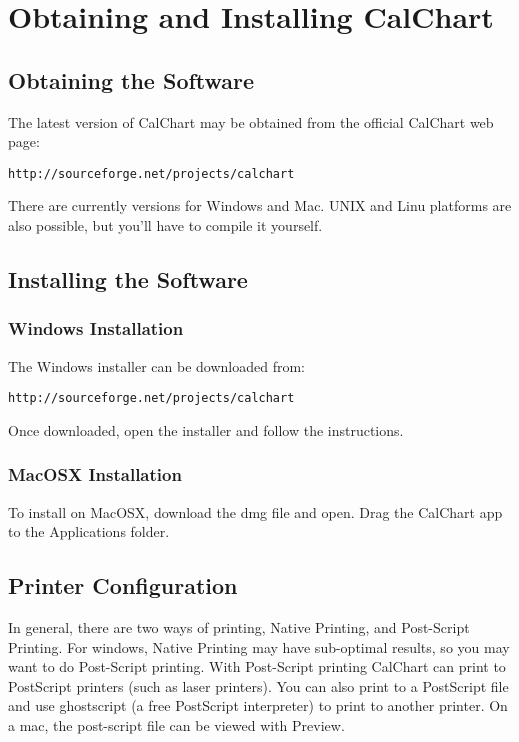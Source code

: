\chapter{Obtaining and Installing CalChart}\label{software}

\section{Obtaining the Software}\label{obtaining}

The latest version of CalChart may be obtained from the official
CalChart web page:

\begin{verbatim}
http://sourceforge.net/projects/calchart
\end{verbatim}

There are currently versions for Windows and Mac.
UNIX and Linu platforms are also possible, but you'll
have to compile it yourself.

\section{Installing the Software}\label{installing}

\subsection{Windows Installation}\label{wininstall}

The Windows installer can be downloaded from:

\begin{verbatim}
http://sourceforge.net/projects/calchart
\end{verbatim}

Once downloaded, open the installer and follow the instructions.

\subsection{MacOSX Installation}\label{macosxinstall}

To install on MacOSX, download the dmg file and open.  Drag the CalChart app
to the Applications folder.

\section{Printer Configuration}\label{winprinter}

In general, there are two ways of printing, Native Printing, and Post-Script
Printing.  For windows, Native Printing may have sub-optimal results, so you
may want to do Post-Script printing.  With Post-Script printing CalChart can
print to PostScript printers (such as laser printers).  You can also  print
to a PostScript file and use ghostscript (a free PostScript interpreter) to
print to another printer.  On a mac, the post-script file can be viewed with Preview.

